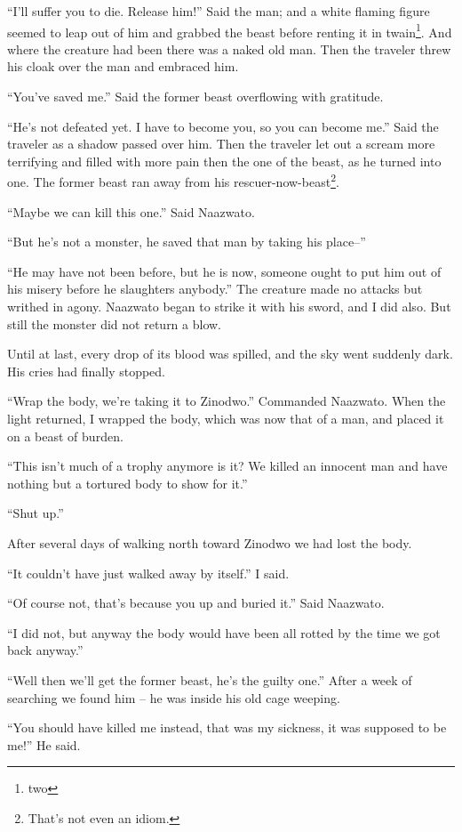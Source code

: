 ``I'll suffer you to die. Release him!'' Said the man; and a white flaming figure seemed to leap out of him and grabbed the beast before renting it in twain\footnote{two}.
And where the creature had been there was a naked old man. Then the traveler threw his cloak over the man and embraced him.

``You've saved me.'' Said the former beast overflowing with gratitude. 

``He's not defeated yet. I have to become you, so you can become me.'' Said the traveler as a shadow passed over him. Then the traveler let out a scream more terrifying and filled with more pain then the one of the beast, as he turned into one. The former beast ran away from his rescuer-now-beast\footnote{That's not even an idiom.}.

``Maybe we can kill this one.'' Said Naazwato.

``But he's not a monster, he saved that man by taking his place--''

``He may have not been before, but he is now, someone ought to put him out of his misery before he slaughters anybody.''
The creature made no attacks but writhed in agony. Naazwato began to strike it with his sword, and I did also. But still the monster did not return a blow.

Until at last, every drop of its blood was spilled, and the sky went suddenly dark. His cries had finally stopped.

``Wrap the body, we're taking it to Zinodwo.'' Commanded Naazwato.
When the light returned, I wrapped the body, which was now that of a man, and placed it on a beast of burden.

``This isn't much of a trophy anymore is it? We killed an innocent man and have nothing but a tortured body to show for it.''

``Shut up.''

After several days of walking north toward Zinodwo we had lost the body.

``It couldn't have just walked away by itself.'' I said.

``Of course not, that's because you up and buried it.'' Said Naazwato.

``I did not, but anyway the body would have been all rotted by the time we got back anyway.''

``Well then we'll get the former beast, he's the guilty one.''
After a week of searching we found him -- he was inside his old cage weeping.

``You should have killed me instead, that was my sickness, it was supposed to be me!'' He said.

